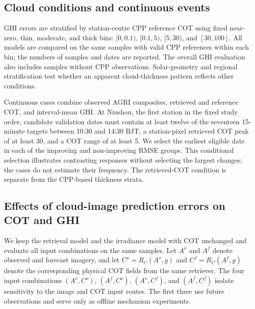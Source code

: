 \documentclass[11pt]{article}
\begin{document}
\subsection{Cloud conditions and continuous events}
GHI errors are stratified by station-centre CPP reference COT using fixed near-zero, thin, moderate, and thick bins: $[0,0.1)$, $[0.1,5)$, $[5,30)$, and $[30,100]$. All models are compared on the same samples with valid CPP references within each bin; the numbers of samples and dates are reported. The overall GHI evaluation also includes samples without CPP observations. Solar-geometry and regional stratification test whether an apparent cloud-thickness pattern reflects other conditions.

Continuous cases combine observed AGRI composites, retrieved and reference COT, and interval-mean GHI. At Niushou, the first station in the fixed study order, candidate validation dates must contain at least twelve of the seventeen 15-minute targets between 10:30 and 14:30 BJT, a station-pixel retrieved COT peak of at least 30, and a COT range of at least 5. We select the earliest eligible date in each of the improving and non-improving RMSE groups. This conditional selection illustrates contrasting responses without selecting the largest changes; the cases do not estimate their frequency. The retrieved-COT condition is separate from the CPP-based thickness strata.

\subsection{Effects of cloud-image prediction errors on COT and GHI}
We keep the retrieval model and the irradiance model with COT unchanged and evaluate all input combinations on the same samples. Let $A^o$ and $A^f$ denote observed and forecast imagery, and let $C^o=R_C(A^o,g)$ and $C^f=R_C(A^f,g)$ denote the corresponding physical COT fields from the same retriever. The four input combinations $(A^o,C^o)$, $(A^f,C^o)$, $(A^o,C^f)$, and $(A^f,C^f)$ isolate sensitivity to the image and COT input routes. The first three use future observations and serve only as offline mechanism experiments.
\end{document}
